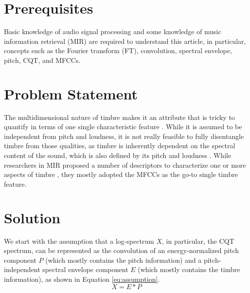 \documentclass[journal]{IEEEtran}
\begin{document}
\section{Prerequisites}

Basic knowledge of audio signal processing and some knowledge of music information retrieval (MIR) are required to understand this article, in particular, concepts such as the Fourier transform (FT), convolution, spectral envelope, pitch, CQT, and MFCCs.


\section{Problem Statement}

The multidimensional nature of timbre makes it an attribute that is tricky to quantify in terms of one single characteristic feature \cite{grey1977}. While it is assumed to be independent from pitch and loudness, it is not really feasible to fully disentangle timbre from those qualities, as timbre is inherently dependent on the spectral content of the sound, which is also defined by its pitch and loudness \cite{moore2004}. While researchers in MIR proposed a number of descriptors to characterize one or more aspects of timbre \cite{peeters2003}, they mostly adopted the MFCCs as the go-to single timbre feature.


%

\cite{engel2017}


\section{Solution}



We start with the assumption that a log-spectrum $X$, in particular, the CQT spectrum, can be represented as the convolution of an energy-normalized pitch component $P$ (which mostly contains the pitch information) and a pitch-independent spectral envelope component $E$ (which mostly contains the timbre information), as shown in Equation \ref{eq:assumption}.
\begin{equation}
\label{eq:assumption}
X = E * P
\end{equation}
\end{document}
